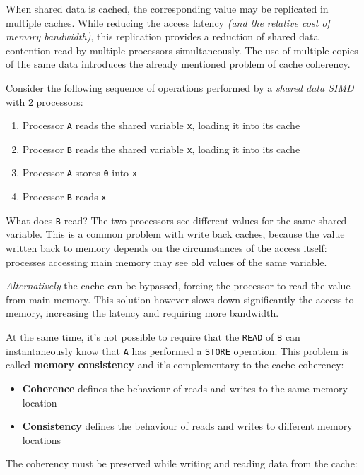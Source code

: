 \documentclass[english]{article}
\begin{document}
When shared data is cached, the corresponding value may be replicated in multiple caches.
While reducing the access latency \textit{(and the relative cost of memory bandwidth)}, this replication provides a reduction of shared data contention read by multiple processors simultaneously.
The use of multiple copies of the same data introduces the already mentioned problem of cache coherency.

Consider the following sequence of operations performed by a \textit{shared data SIMD} with \(2\) processors:

\begin{enumerate}
  \item Processor \texttt{A} reads the shared variable \texttt{x}, loading it into its cache
  \item Processor \texttt{B} reads the shared variable \texttt{x}, loading it into its cache
  \item Processor \texttt{A} stores \texttt{0} into \texttt{x}
  \item Processor \texttt{B} reads \texttt{x}
\end{enumerate}

What does \texttt{B} read?
The two processors see different values for the same shared variable.
This is a common problem with write back caches, because the value written back to memory depends on the circumstances of the access itself: processes accessing main memory may see old values of the same variable.

\textit{Alternatively} the cache can be bypassed, forcing the processor to read the value from main memory.
This solution however slows down significantly the access to memory, increasing the latency and requiring more bandwidth.

At the same time, it's not possible to require that the \texttt{READ} of \texttt{B} can instantaneously know that \texttt{A} has performed a \texttt{STORE} operation.
This problem is called \textbf{memory consistency} and it's complementary to the cache coherency:

\begin{itemize}
  \item \textbf{Coherence} defines the behaviour of reads and writes to the same memory location
  \item \textbf{Consistency} defines the behaviour of reads and writes to different memory locations
\end{itemize}

\bigskip
The coherency must be preserved while writing and reading data from the cache:
\end{document}
